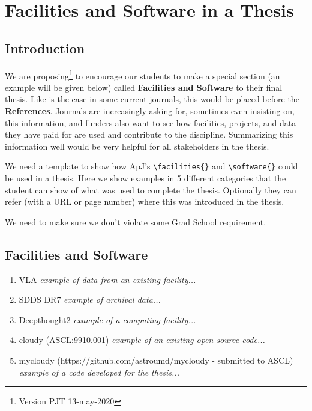 \documentclass[12pt]{article}
\begin{document}
\section{Facilities and Software in a Thesis}


\subsection*{Introduction}

We are proposing\footnote{Version PJT 13-may-2020}
to encourage our students to make a special section
(an example will be given below) called {\bf Facilities and Software}
to their final thesis. Like is the case in some current journals,
this would be placed before the {\bf References}. Journals are
increasingly asking for, sometimes even insisting on, this
information, and funders also want to see how facilities, projects,
and data they have paid for are used and contribute to the
discipline. Summarizing this information well would be very helpful
for all stakeholders in the thesis.


We need a template to show how ApJ's \verb+\facilities{}+ and
\verb+\software{}+ could be used in a thesis. Here we show examples in
5 different categories that the student can show of what was used to
complete the thesis. Optionally they can refer (with a URL or page
number) where this was introduced in the thesis.


We need to make sure we don't violate some Grad School requirement.

\subsection{Facilities and Software}

\begin{enumerate}
\item
  VLA
  \newline
  {\it example of data from an existing facility...}

\item
  SDDS DR7
  \newline
  {\it example of archival data...}

\item
  Deepthought2
    \newline
  {\it example of a computing facility...}

\item
  cloudy (ASCL:9910.001)
    \newline
  {\it example of an existing open source code...}

\item
  mycloudy (https://github.com/astroumd/mycloudy - submitted to ASCL)
  \newline
    {\it example of a code developed for the thesis...}

\end{enumerate}

 
\end{document}
